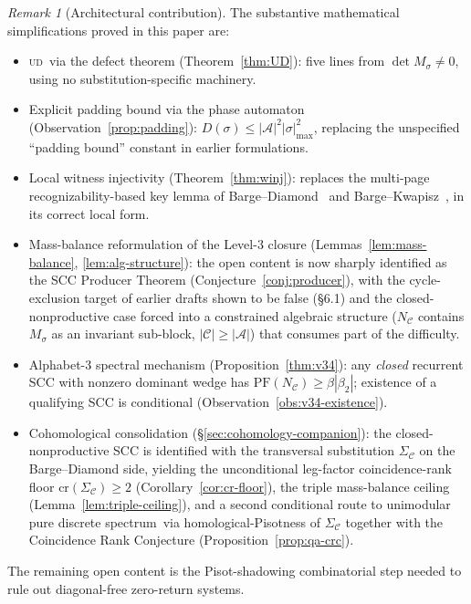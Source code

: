 \documentclass[11pt]{article}
\theoremstyle{plain}
\theoremstyle{definition}
\theoremstyle{remark}
\newtheorem{remark}[theorem]{Remark}
\newcommand{\UD}{\textsc{ud}}
\newcommand{\PDS}{pure discrete spectrum}
\newcommand{\A}{\mathcal{A}}
\newcommand{\C}{\mathcal{C}}
\newcommand{\PFroot}{\mathrm{PF}}
\begin{document}
\begin{remark}[Architectural contribution]\label{rem:architecture}
The substantive mathematical simplifications proved in this paper are:
\begin{itemize}[leftmargin=*]
\item \UD\ via the defect theorem (Theorem~\ref{thm:UD}): five lines from $\det M_\sigma\ne 0$, using no substitution-specific machinery.
\item Explicit padding bound via the phase automaton (Observation~\ref{prop:padding}): $D(\sigma)\le|\A|^2|\sigma|_{\max}^2$, replacing the unspecified ``padding bound'' constant in earlier formulations.
\item Local witness injectivity (Theorem~\ref{thm:winj}): replaces the multi-page recognizability-based key lemma of Barge--Diamond~\cite{BD} and Barge--Kwapisz~\cite{BK}, in its correct local form.
\item Mass-balance reformulation of the Level-3 closure (Lemmas~\ref{lem:mass-balance}, \ref{lem:alg-structure}): the open content is now sharply identified as the SCC Producer Theorem (Conjecture~\ref{conj:producer}), with the cycle-exclusion target of earlier drafts shown to be false (\S6.1) and the closed-nonproductive case forced into a constrained algebraic structure ($N_\C$ contains $M_\sigma$ as an invariant sub-block, $|\C|\ge|\A|$) that consumes part of the difficulty.
\item Alphabet-$3$ spectral mechanism (Proposition~\ref{thm:v34}): any \emph{closed} recurrent SCC with nonzero dominant wedge has $\PFroot(N_\C)\ge\beta|\beta_2|$; existence of a qualifying SCC is conditional (Observation~\ref{obs:v34-existence}).
\item Cohomological consolidation (\S\ref{sec:cohomology-companion}): the closed-nonproductive SCC is identified with the transversal substitution $\Sigma_\C$ on the Barge--Diamond side, yielding the unconditional leg-factor coincidence-rank floor $\mathrm{cr}(\Sigma_\C)\ge 2$ (Corollary~\ref{cor:cr-floor}), the triple mass-balance ceiling (Lemma~\ref{lem:triple-ceiling}), and a second conditional route to unimodular \PDS\ via homological-Pisotness of $\Sigma_\C$ together with the Coincidence Rank Conjecture (Proposition~\ref{prop:qa-crc}).
\end{itemize}
The remaining open content is the Pisot-shadowing combinatorial step needed to rule out diagonal-free zero-return systems.
\end{remark}
\end{document}
